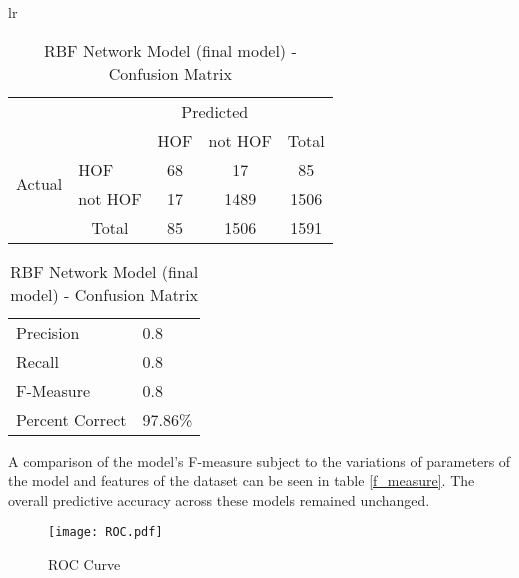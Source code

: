 \documentclass[paper=a4, fontsize=11pt]{scrartcl} %
\numberwithin{equation}{section} %
\numberwithin{figure}{section} %
\numberwithin{table}{section} %
\begin{document}
\begin{table}[thb]
\centering
\caption{\label{final_rbf_confusion}RBF Network Model (final model) - Confusion Matrix}
\begin{tabular}{lr}

\begin{tabular}{l|l|c|c|c}
\multicolumn{2}{c}{}&\multicolumn{2}{c}{Predicted}&\\
\cline{3-4}
\multicolumn{2}{c|}{}& HOF & not HOF &\multicolumn{1}{c}{Total}\\
\cline{2-4}
\multirow{2}{*}{Actual}& HOF & 68 & 17 & 85\\
\cline{2-4}
& not HOF & 17 & 1489 & 1506\\
\cline{2-4}
\multicolumn{1}{c}{} & \multicolumn{1}{c}{Total} & \multicolumn{1}{c}{85} & \multicolumn{1}{c}{1506} & \multicolumn{1}{c}{1591}\\
\end{tabular}

\begin{tabular}{ | l | l | }
\hline
  Precision & 0.8 \\
  Recall & 0.8  \\
  F-Measure & 0.8 \\
  Percent Correct & 97.86\%\\
  \hline
\end{tabular}

\end{tabular}
\end{table}

A comparison of the model's F-measure subject to the variations of parameters of the model and features of the dataset can be seen in table \ref{f_measure}. The overall predictive accuracy across these models remained unchanged.


\begin{wrapfigure}{r}{0.5\textwidth}
    \vspace{-30pt}
  \begin{center}
    \texttt{[image: ROC.pdf]}
  \end{center}
    \vspace{-30pt}
  \caption{\label{rbf_roc}ROC Curve}
  \vspace{-10pt}
\end{wrapfigure}
\end{document}
